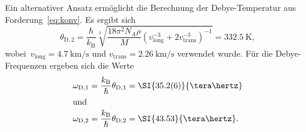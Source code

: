 %
Ein alternativer Ansatz ermöglicht die Berechnung der Debye-Temperatur aus
Forderung~\eqref{eq:konv}. Es ergibt sich
%
\begin{equation}
  \theta_{\mathrm{D},2}=\frac{\hbar}{k_{\mathrm{B}}}\sqrt[3]{\frac{18\pi^2N_A\rho}{M}\left(v_{\mathrm{long}}^{-3}+2v_{\mathrm{trans}}^{-3}\right)^{-1}}=\SI{332,5}{\kelvin},
\end{equation}
%
wobei~$v_{\mathrm{long}}=\SI{4.7}{\kilo\metre\per\second}$ und $v_{\mathrm{trans}}=\SI{2.26}{\kilo\metre\per\second}$ verwendet wurde.
Für die Debye-Frequenzen ergeben sich die Werte
%
\begin{align}
  \omega_{\mathrm{D},1}&=\frac{k_{\mathrm{B}}}{\hbar}\theta_{\mathrm{D},1}=\SI{35.2(6)}{\tera\hertz} \\
  \shortintertext{und}
  \omega_{\mathrm{D},2}&=\frac{k_{\mathrm{B}}}{\hbar}\theta_{\mathrm{D},2}=\SI{43.53}{\tera\hertz}.
\end{align}

